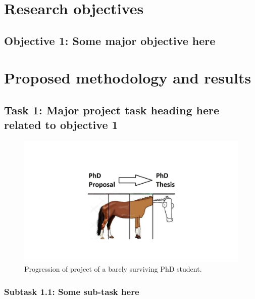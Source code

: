 \documentclass[12pt]{article}
\numberwithin{equation}{section}
\begin{document}
\section{Research objectives}       %

\blindtext


\subsection*{Objective 1: Some major objective here}

\blindtext




\section{Proposed methodology and results} %

\subsection{Task 1: Major project task heading here related to objective 1}

\blindtext

\begin{figure}[ht]
\begin{center}
    \includegraphics[width=12.5cm, trim={9cm 3cm 9cm 4cm},clip,page=1] {proposal_figures.pdf}
    \caption{Progression of project of a barely surviving PhD student.}
    \label{fig:proposal-plan}
\end{center}
\end{figure}




\subsubsection*{Subtask 1.1: Some sub-task here}
\blindtext
\end{document}
